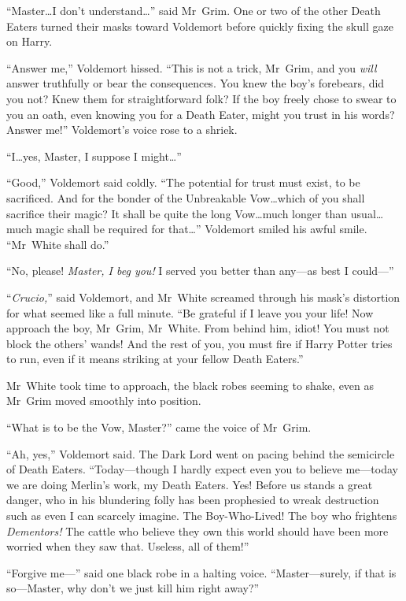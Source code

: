 “Master…I don’t understand…” said Mr~Grim. One or two of the other Death Eaters turned their masks toward Voldemort before quickly fixing the skull gaze on Harry.

“Answer me,” Voldemort hissed. “This is not a trick, Mr~Grim, and you \emph{will} answer truthfully or bear the consequences. You knew the boy’s forebears, did you not? Knew them for straightforward folk? If the boy freely chose to swear to you an oath, even knowing you for a Death Eater, might you trust in his words? Answer me!” Voldemort’s voice rose to a shriek.

“I…yes, Master, I suppose I might…”

“Good,” Voldemort said coldly. “The potential for trust must exist, to be sacrificed. And for the bonder of the Unbreakable Vow…which of you shall sacrifice their magic? It shall be quite the long Vow…much longer than usual…much magic shall be required for that…” Voldemort smiled his awful smile. “Mr~White shall do.”

“No, please! \emph{Master, I beg you!} I served you better than any—as best I could—”

“\emph{Crucio,}” said Voldemort, and Mr~White screamed through his mask’s distortion for what seemed like a full minute. “Be grateful if I leave you your life! Now approach the boy, Mr~Grim, Mr~White. From behind him, idiot! You must not block the others’ wands! And the rest of you, you must fire if Harry Potter tries to run, even if it means striking at your fellow Death Eaters.”

Mr~White took time to approach, the black robes seeming to shake, even as Mr~Grim moved smoothly into position.

“What is to be the Vow, Master?” came the voice of Mr~Grim.

“Ah, yes,” Voldemort said. The Dark Lord went on pacing behind the semicircle of Death Eaters. “Today—though I hardly expect even you to believe me—today we are doing Merlin’s work, my Death Eaters. Yes! Before us stands a great danger, who in his blundering folly has been prophesied to wreak destruction such as even I can scarcely imagine. The Boy-Who-Lived! The boy who frightens \emph{Dementors!} The cattle who believe they own this world should have been more worried when they saw that. Useless, all of them!”

“Forgive me—” said one black robe in a halting voice. “Master—surely, if that is so—Master, why don’t we just kill him right away?”

